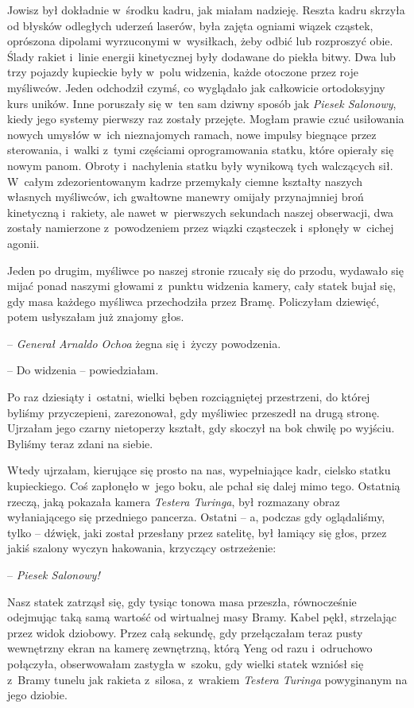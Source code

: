 \documentclass[oneside,polish,11pt,sfheadings]{mwbk}
\begin{document}
Jowisz był dokładnie w~środku kadru, jak miałam nadzieję. Reszta kadru
skrzyła od błysków odległych uderzeń laserów, była zajęta ogniami wiązek
cząstek, oprószona dipolami wyrzuconymi w~wysiłkach, żeby odbić lub
rozproszyć obie. Ślady rakiet i~linie energii kinetycznej były dodawane
do piekła bitwy. Dwa lub trzy pojazdy kupieckie były w~polu widzenia,
każde otoczone przez roje myśliwców. Jeden odchodził czymś, co wyglądało
jak całkowicie ortodoksyjny kurs uników. Inne poruszały się w~ten sam
dziwny sposób jak \textit{Piesek Salonowy}, kiedy jego systemy pierwszy
raz zostały przejęte. Mogłam prawie czuć usiłowania nowych umysłów w~ich
nieznajomych ramach, nowe impulsy biegnące przez sterowania, i~walki z~tymi częściami oprogramowania statku, które opierały się nowym panom.
Obroty i~nachylenia statku były wynikową tych walczących sił. W~całym
zdezorientowanym kadrze przemykały ciemne kształty naszych własnych
myśliwców, ich gwałtowne manewry omijały przynajmniej broń kinetyczną i~rakiety, ale nawet w~pierwszych sekundach naszej obserwacji, dwa zostały
namierzone z~powodzeniem przez wiązki cząsteczek i~spłonęły w~cichej
agonii.

Jeden po drugim, myśliwce po naszej stronie rzucały się do przodu,
wydawało się mijać ponad naszymi głowami z~punktu widzenia kamery, cały
statek bujał się, gdy masa każdego myśliwca przechodziła przez Bramę.
Policzyłam dziewięć, potem usłyszałam już znajomy głos.

-- \textit{Generał Arnaldo Ochoa} żegna się i~życzy powodzenia.

-- Do widzenia -- powiedziałam.

Po raz dziesiąty i~ostatni, wielki bęben rozciągniętej przestrzeni, do
której byliśmy przyczepieni, zarezonował, gdy myśliwiec przeszedł na
drugą stronę. Ujrzałam jego czarny nietoperzy kształt, gdy skoczył na
bok chwilę po wyjściu. Byliśmy teraz zdani na siebie.

Wtedy ujrzałam, kierujące się prosto na nas, wypełniające kadr, cielsko
statku kupieckiego. Coś zapłonęło w~jego boku, ale pchał się dalej mimo
tego. Ostatnią rzeczą, jaką pokazała kamera \textit{Testera Turinga}, był
rozmazany obraz wyłaniającego się przedniego pancerza. Ostatni -- a,
podczas gdy oglądaliśmy, tylko -- dźwięk, jaki został przesłany przez
satelitę, był łamiący się głos, przez jakiś szalony wyczyn hakowania,
krzyczący ostrzeżenie:

-- \textit{Piesek Salonowy!}

Nasz statek zatrząsł się, gdy tysiąc tonowa masa przeszła, równocześnie
odejmując taką samą wartość od wirtualnej masy Bramy. Kabel pękł,
strzelając przez widok dziobowy. Przez całą sekundę, gdy przełączałam
teraz pusty wewnętrzny ekran na kamerę zewnętrzną, którą Yeng od razu i~odruchowo połączyła, obserwowałam zastygła w~szoku, gdy wielki statek
wzniósł się z~Bramy tunelu jak rakieta z~silosa, z~wrakiem \textit{Testera
Turinga} powyginanym na jego dziobie.
\end{document}
